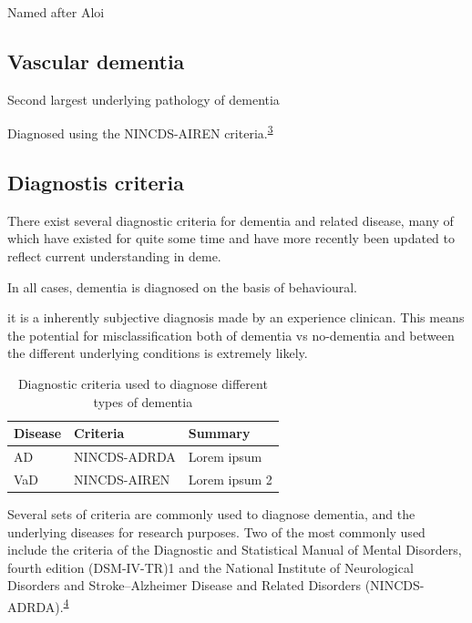 \documentclass[a4paper, twoside]{templates/ociamthesis}
\begin{document}
Named after Aloi

\hypertarget{vascular-dementia}{%
\subsection{Vascular dementia}\label{vascular-dementia}}

Second largest underlying pathology of dementia

Diagnosed using the NINCDS-AIREN criteria.\textsuperscript{\protect\hyperlink{ref-roman1993vascular}{3}}

\hypertarget{diagnostis-criteria}{%
\subsection{Diagnostis criteria}\label{diagnostis-criteria}}

There exist several diagnostic criteria for dementia and related disease, many of which have existed for quite some time and have more recently been updated to reflect current understanding in deme.

In all cases, dementia is diagnosed on the basis of behavioural.

it is a inherently subjective diagnosis made by an experience clinican. This means the potential for misclassification both of dementia vs no-dementia and between the different underlying conditions is extremely likely.

\begin{table}[!h]

\caption{\label{tab:diagnosticCriteria-table}Diagnostic criteria used to diagnose different types of dementia}
\centering
\begin{tabular}[t]{lll}
\toprule
Disease & Criteria & Summary\\
\midrule
AD & NINCDS-ADRDA & Lorem ipsum\\
VaD & NINCDS-AIREN & Lorem ipsum 2\\
\bottomrule
\end{tabular}
\end{table}

Several sets of criteria are commonly used to diagnose dementia, and the underlying diseases for research purposes. Two of the most commonly used include the criteria of the Diagnostic and Statistical Manual of Mental Disorders, fourth edition (DSM-IV-TR)1 and the National Institute of Neurological Disorders and Stroke--Alzheimer Disease and Related Disorders (NINCDS-ADRDA).\textsuperscript{\protect\hyperlink{ref-dubois2007}{4}}
\end{document}
